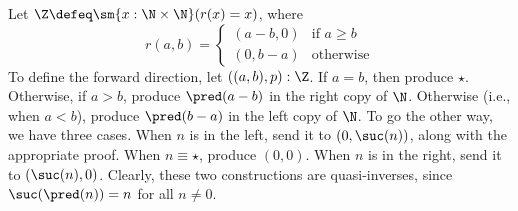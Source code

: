  \soln
Let $\Z \defeq \sm{x : \N \times \N} (r(x) = x)$, where
\[
  r(a, b) = \begin{cases}
    (a - b, 0) & \text{if $a \geq b$} \\
    (0, b - a) & \text{otherwise}
 \end{cases}
\]
To define the forward direction, let $((a, b), p) : \Z$.  If $a = b$, then
produce $\star$.  Otherwise, if $a > b$, produce $\pred(a - b)$ in the right
copy of $\N$.  Otherwise (i.e., when $a < b$), produce $\pred(b - a)$ in the
left copy of $\N$.  To go the other way, we have three cases.  When $n$ is
in the left, send it to $(0, \suc(n))$, along with the appropriate proof.  When
$n \equiv \star$, produce $(0, 0)$.  When $n$ is in the right, send it to
$(\suc(n), 0)$.  Clearly, these two constructions are quasi-inverses, since
$\suc(\pred(n)) = n$ for all $n \neq 0$.
